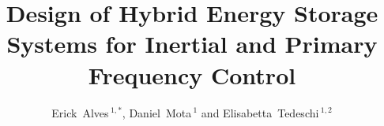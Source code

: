 \documentclass[utf8]{frontiersSCNS} %
\def\firstAuthorLast{Alves {et~al.}} %
\def\Authors{Erick~Alves\,$^{1,*}$, Daniel~Mota\,$^{1}$ and Elisabetta~Tedeschi\,$^{1,2}$}
\begin{document}
\onecolumn
{}

\title[HESS for Frequency Control]{Design of Hybrid Energy Storage Systems for Inertial and Primary Frequency Control} 

\author[\firstAuthorLast ]{\Authors} %
\address{} %
\correspondance{} %

\extraAuth{}%


\maketitle
\end{document}
